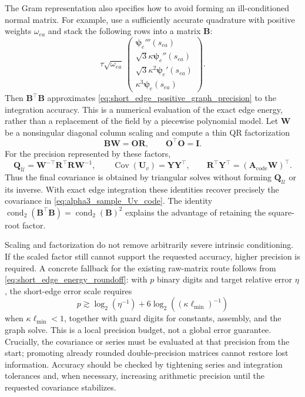 \documentclass[11pt,a4paper]{article}
\theoremstyle{plain}
\theoremstyle{definition}
\begin{document}
The Gram representation also specifies how to avoid forming an
ill-conditioned normal matrix. For example, use a sufficiently
accurate quadrature with positive weights $\omega_{ea}$ and stack the
following rows into a matrix $\mathbf B$:
\begin{equation}
\tau\sqrt{\omega_{ea}}\,
\begin{pmatrix}
\boldsymbol\psi_e'''(s_{ea})\\
\sqrt{3}\kappa\boldsymbol\psi_e''(s_{ea})\\
\sqrt{3}\kappa^2\boldsymbol\psi_e'(s_{ea})\\
\kappa^3\boldsymbol\psi_e(s_{ea})
\end{pmatrix}.
\end{equation}
Then $\mathbf B^\top\mathbf B$ approximates
\eqref{eq:short_edge_positive_graph_precision} to the integration
accuracy. This is a numerical evaluation of the exact edge energy,
rather than a replacement of the field by a piecewise polynomial model.
Let $\mathbf W$ be a nonsingular diagonal column scaling and compute
a thin QR factorization
\begin{equation}
\mathbf B\mathbf W=\mathbf O\mathbf R,
\qquad \mathbf O^\top\mathbf O=\mathbf I.
\end{equation}
For the precision represented by these factors,
\begin{equation}
\mathbf Q_{\mathcal U}
=\mathbf W^{-\top}\mathbf R^\top\mathbf R\mathbf W^{-1},
\qquad
\operatorname{Cov}(\mathbf U_v)=\mathbf Y\mathbf Y^\top,
\qquad
\mathbf R^\top\mathbf Y^\top
=(\mathbf A_{\mathrm{code}}\mathbf W)^\top.
\label{eq:short_edge_square_root_covariance}
\end{equation}
Thus the final covariance is obtained by triangular solves without
forming $\mathbf Q_{\mathcal U}$ or its inverse. With exact edge
integration these identities recover precisely the covariance in
\eqref{eq:alpha3_sample_Uv_code}. The identity
$\operatorname{cond}_2(\mathbf B^\top\mathbf B)
=\operatorname{cond}_2(\mathbf B)^2$ explains the advantage of retaining
the square-root factor.

Scaling and factorization do not remove arbitrarily severe intrinsic
conditioning. If the scaled factor still cannot support the requested
accuracy, higher precision is required. A concrete fallback for the
existing raw-matrix route follows from
\eqref{eq:short_edge_energy_roundoff}: with $p$ binary digits and
target relative error $\eta$, the short-edge error scale requires
\begin{equation}
p\gtrsim\log_2(\eta^{-1})
       +6\log_2\!\left((\kappa\ell_{\min})^{-1}\right)
\label{eq:short_edge_precision_budget}
\end{equation}
when $\kappa\ell_{\min}<1$, together with guard digits for constants,
assembly, and the graph solve. This is a local precision budget, not
a global error guarantee. Crucially, the covariance or series must be
evaluated at that precision from the start; promoting already rounded
double-precision matrices cannot restore lost information. Accuracy
should be checked by tightening series and integration tolerances and,
when necessary, increasing arithmetic precision until the requested
covariance stabilizes.
\end{document}
